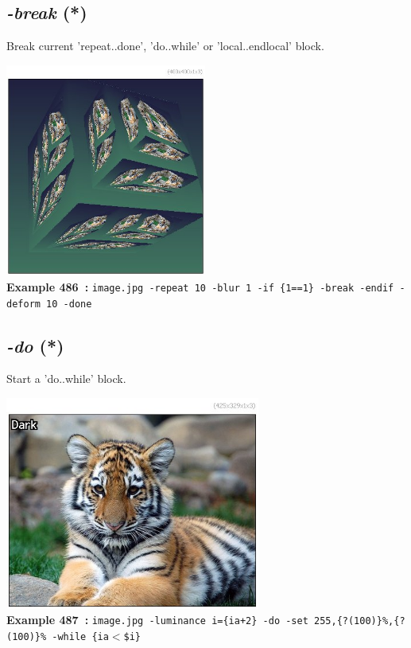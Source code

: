 \documentclass[a4paper,11pt,twoside]{book}
\begin{document}
\subsection{\emph{-break} (*)}\vspace*{-0.5em}
Break current 'repeat..done', 'do..while' or 'local..endlocal' block.
\begin{center}\includegraphics[keepaspectratio=true,height=7cm,width=\textwidth]{img/gmic_def486.jpg}\\
{\footnotesize \textbf{Example 486~:} \texttt{image.jpg -repeat 10 -blur 1 -if \{1==1\} -break -endif -deform 10 -done}}
\end{center}

\subsection{\emph{-do} (*)}\vspace*{-0.5em}
Start a 'do..while' block.
\begin{center}\includegraphics[keepaspectratio=true,height=7cm,width=\textwidth]{img/gmic_def487.jpg}\\
{\footnotesize \textbf{Example 487~:} \texttt{image.jpg -luminance i=\{ia+2\} -do -set 255,\{?(100)\}\%,\{?(100)\}\% -while \{ia$<$\$i\}}}
\end{center}
\end{document}
